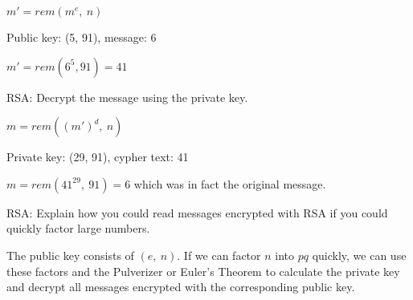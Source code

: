 \documentclass[../main.tex]{subfiles}
\begin{document}
\begin{questions}
\begin{solution}
    $m'=rem(m^e,\ n)$

    Public key: (5, 91), message: 6

    $m'=rem(6^5, 91)=41$
  \end{solution}

  \question RSA: Decrypt the message using the private key. 
  \begin{solution}
    $m=rem((m')^d,\ n)$

    Private key: (29, 91), cypher text: 41

    $m=rem(41^{29},\ 91)=6$ which was in fact the original message.
  \end{solution}

  \question RSA: Explain how you could read messages encrypted with RSA if you could quickly factor large numbers.
  \begin{solution}
    The public key consists of $(e,\ n)$. If we can factor $n$ into $pq$ quickly, we can use these factors and the Pulverizer or Euler's Theorem to calculate the private key and decrypt all messages encrypted with the corresponding public key.
  \end{solution}
\end{questions}
\end{document}
